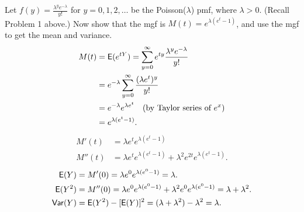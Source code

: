 \documentclass[12pt]{article}
\newcommand{\E}{{\sf E}}
\newcommand{\Var}{{\sf Var}}
\newenvironment{problem}[2][Problem]{\begin{trivlist}
\item[\hskip \labelsep {\bfseries #1}\hskip \labelsep {\bfseries #2.}]}
{\end{trivlist}}
\begin{document}
\begin{problem}{8}
  Let $f (y) = \frac{\lambda^y e^{-\lambda}}{y!}$ for $y = 0, 1, 2, \ldots$ 
  be the Poisson($\lambda$) pmf, where $\lambda > 0$. (Recall Problem
  1 above.) Now show that the mgf is $M (t) = e^{\lambda(e^t-1)}$, 
  and use the mgf to get the mean and variance.
  \[
    \begin{aligned}
      M(t) &= \E(e^{tY}) = \sum_{y=0}^{\infty} e^{ty} 
      \frac{\lambda^y e^{-\lambda}}{y!} \\
      &= e^{-\lambda} \sum_{y=0}^{\infty} \frac{(\lambda e^t)^y}{y!} \\
      &= e^{-\lambda} e^{\lambda e^t} \quad (\text{by Taylor series of } e^x) \\
      &= e^{\lambda(e^t - 1)}.
    \end{aligned}
  \]
  \[
    \begin{aligned}
      M'(t) &= \lambda e^t e^{\lambda(e^t - 1)} \\
      M''(t) &= \lambda e^t e^{\lambda(e^t - 1)} + \lambda^2 e^{2t} 
      e^{\lambda(e^t - 1)}.
    \end{aligned}
  \]
  \[
    \begin{aligned}
      \E(Y) &= M'(0) = \lambda e^0 e^{\lambda(e^0 - 1)} = \lambda. \\
      \E(Y^2) &= M''(0) = \lambda e^0 e^{\lambda(e^0 - 1)} + 
      \lambda^2 e^{0} e^{\lambda(e^0 - 1)} 
      = \lambda + \lambda^2. \\
      \Var(Y) &= \E(Y^2) - [\E(Y)]^2 = (\lambda + \lambda^2) - 
      \lambda^2 = \lambda.
    \end{aligned}
  \]

\end{problem}
\end{document}

